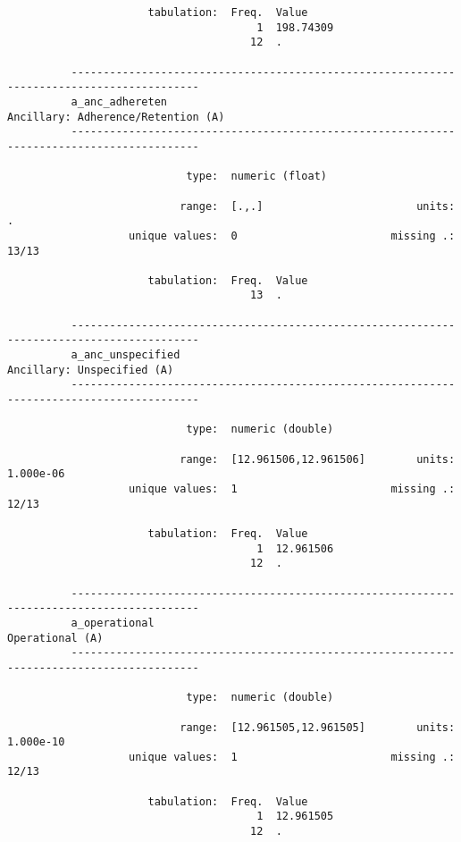 \documentclass{article}
\begin{document}
\begin{verbatim}
                      tabulation:  Freq.  Value
                                       1  198.74309
                                      12  .
          
          ------------------------------------------------------------------------------------------
          a_anc_adhereten                                         Ancillary: Adherence/Retention (A)
          ------------------------------------------------------------------------------------------
          
                            type:  numeric (float)
          
                           range:  [.,.]                        units:  .
                   unique values:  0                        missing .:  13/13
          
                      tabulation:  Freq.  Value
                                      13  .
          
          ------------------------------------------------------------------------------------------
          a_anc_unspecified                                               Ancillary: Unspecified (A)
          ------------------------------------------------------------------------------------------
          
                            type:  numeric (double)
          
                           range:  [12.961506,12.961506]        units:  1.000e-06
                   unique values:  1                        missing .:  12/13
          
                      tabulation:  Freq.  Value
                                       1  12.961506
                                      12  .
          
          ------------------------------------------------------------------------------------------
          a_operational                                                              Operational (A)
          ------------------------------------------------------------------------------------------
          
                            type:  numeric (double)
          
                           range:  [12.961505,12.961505]        units:  1.000e-10
                   unique values:  1                        missing .:  12/13
          
                      tabulation:  Freq.  Value
                                       1  12.961505
                                      12  .
          

\end{verbatim}
\end{document}
